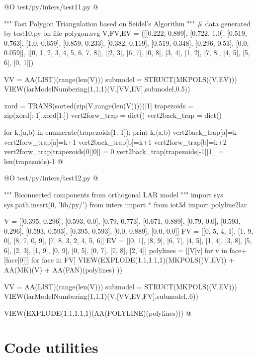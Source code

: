 \documentclass[11pt,oneside]{article}    %
\begin{document}
@O test/py/inters/test11.py
@{""" Fast Polygon Triangulation based on Seidel's Algorithm """
# data generated by test10.py on file polygon.svg
V,FV,EV = ([[0.222, 0.889],
  [0.722, 1.0],
  [0.519, 0.763],
  [1.0, 0.659],
  [0.859, 0.233],
  [0.382, 0.119],
  [0.519, 0.348],
  [0.296, 0.53],
  [0.0, 0.059]],
 [[0, 1, 2, 3, 4, 5, 6, 7, 8]],
 [[2, 3], [6, 7], [0, 8], [3, 4], [1, 2], [7, 8], [4, 5], [5, 6], [0, 1]])
 
VV = AA(LIST)(range(len(V)))
submodel = STRUCT(MKPOLS((V,EV)))
VIEW(larModelNumbering(1,1,1)(V,[VV,EV],submodel,0.5))

 
xord = TRANS(sorted(zip(V,range(len(V)))))[1]
trapezoids = zip(xord[:-1],xord[1:])
vert2forw_trap = dict()
vert2back_trap = dict()

for k,(a,b) in enumerate(trapezoids[1:-1]):
	print k,(a,b)
	vert2back_trap[a]=k
	vert2forw_trap[a]=k+1
	vert2back_trap[b]=k+1
	vert2forw_trap[b]=k+2
vert2forw_trap[trapezoids[0][0]] = 0
vert2back_trap[trapezoids[-1][1]] = len(trapezoids)-1
@}


@O test/py/inters/test12.py
@{""" Biconnected components from orthogonal LAR model """
import sys
sys.path.insert(0, 'lib/py/')
from inters import *
from iot3d import polyline2lar

V = [[0.395, 0.296], [0.593, 0.0], [0.79, 0.773], [0.671, 0.889], [0.79, 0.0], [0.593, 0.296], [0.593, 0.593], [0.395, 0.593], [0.0, 0.889], [0.0, 0.0]]
FV = [[0, 5, 4, 1], [1, 9, 0], [8, 7, 0, 9], [7, 8, 3, 2, 4, 5, 6]]
EV = [[0, 1], [8, 9], [6, 7], [4, 5], [1, 4], [3, 8], [5, 6], [2, 3], [1, 9], [0, 9], [0, 5], [0, 7], [7, 8], [2, 4]]
polylines = [[V[v] for v in face+[face[0]]] for face in FV]
VIEW(EXPLODE(1.1,1.1,1)(MKPOLS((V,EV)) + AA(MK)(V) + AA(FAN)(polylines) ))

VV = AA(LIST)(range(len(V)))
submodel = STRUCT(MKPOLS((V,EV)))
VIEW(larModelNumbering(1,1,1)(V,[VV,EV,FV],submodel,.6))

VIEW(EXPLODE(1.1,1.1,1)(AA(POLYLINE)(polylines)))
@}

\appendix
\section{Code utilities}
\end{document}
